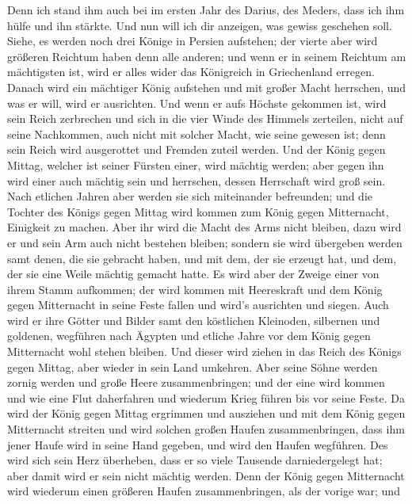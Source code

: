  Denn ich stand ihm auch bei im ersten Jahr des Darius,
des Meders, dass ich ihm hülfe und ihn stärkte.  Und nun
will ich dir anzeigen, was gewiss geschehen soll. Siehe, es werden noch
drei Könige in Persien aufstehen; der vierte aber wird größeren Reichtum
haben denn alle anderen; und wenn er in seinem Reichtum am mächtigsten
ist, wird er alles wider das Königreich in Griechenland erregen.
 Danach wird ein mächtiger König aufstehen und mit großer
Macht herrschen, und was er will, wird er ausrichten.  Und
wenn er aufs Höchste gekommen ist, wird sein Reich zerbrechen und sich
in die vier Winde des Himmels zerteilen, nicht auf seine Nachkommen,
auch nicht mit solcher Macht, wie seine gewesen ist; denn sein Reich
wird ausgerottet und Fremden zuteil werden.  Und der König
gegen Mittag, welcher ist seiner Fürsten einer, wird mächtig werden;
aber gegen ihn wird einer auch mächtig sein und herrschen, dessen
Herrschaft wird groß sein.  Nach etlichen Jahren aber
werden sie sich miteinander befreunden; und die Tochter des Königs gegen
Mittag wird kommen zum König gegen Mitternacht, Einigkeit zu machen.
Aber ihr wird die Macht des Arms nicht bleiben, dazu wird er und sein
Arm auch nicht bestehen bleiben; sondern sie wird übergeben werden samt
denen, die sie gebracht haben, und mit dem, der sie erzeugt hat, und
dem, der sie eine Weile mächtig gemacht hatte.  Es wird
aber der Zweige einer von ihrem Stamm aufkommen; der wird kommen mit
Heereskraft und dem König gegen Mitternacht in seine Feste fallen und
wird's ausrichten und siegen.  Auch wird er ihre Götter
und Bilder samt den köstlichen Kleinoden, silbernen und goldenen,
wegführen nach Ägypten und etliche Jahre vor dem König gegen Mitternacht
wohl stehen bleiben.  Und dieser wird ziehen in das Reich
des Königs gegen Mittag, aber wieder in sein Land umkehren.
 Aber seine Söhne werden zornig werden und große Heere
zusammenbringen; und der eine wird kommen und wie eine Flut daherfahren
und wiederum Krieg führen bis vor seine Feste.  Da wird
der König gegen Mittag ergrimmen und ausziehen und mit dem König gegen
Mitternacht streiten und wird solchen großen Haufen zusammenbringen,
dass ihm jener Haufe wird in seine Hand gegeben,  und
wird den Haufen wegführen. Des wird sich sein Herz überheben, dass er so
viele Tausende darniedergelegt hat; aber damit wird er sein nicht
mächtig werden.  Denn der König gegen Mitternacht wird
wiederum einen größeren Haufen zusammenbringen, als der vorige war; und
